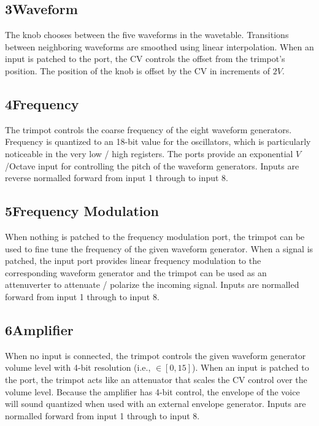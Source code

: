 \documentclass[12pt,letter]{article}
\begin{document}
\subsection*{3{\quad}Waveform}

The knob chooses between the five waveforms in the wavetable. Transitions between neighboring waveforms are smoothed using linear interpolation. When an input is patched to the port, the CV controls the offset from the trimpot's position. The position of the knob is offset by the CV in increments of $2V$.

\subsection*{4{\quad}Frequency}

The trimpot controls the coarse frequency of the eight waveform generators. Frequency is quantized to an 18-bit value for the oscillators, which is particularly noticeable in the very low / high registers. The ports provide an exponential $V$/Octave input for controlling the pitch of the waveform generators. Inputs are reverse normalled forward from input 1 through to input 8.

\subsection*{5{\quad}Frequency Modulation}

When nothing is patched to the frequency modulation port, the trimpot can be used to fine tune the frequency of the given waveform generator. When a signal is patched, the input port provides linear frequency modulation to the corresponding waveform generator and the trimpot can be used as an attenuverter to attenuate / polarize the incoming signal. Inputs are normalled forward from input 1 through to input 8.

\subsection*{6{\quad}Amplifier}

When no input is connected, the trimpot controls the given waveform generator volume level with 4-bit resolution (i.e., $\in [0, 15]$). When an input is patched to the port, the trimpot acts like an attenuator that scales the CV control over the volume level. Because the amplifier has 4-bit control, the envelope of the voice will sound quantized when used with an external envelope generator. Inputs are normalled forward from input 1 through to input 8.
\end{document}
